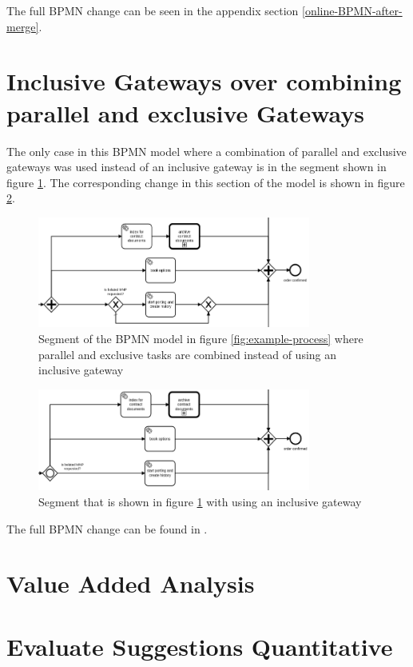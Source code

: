 The full BPMN change can be seen in the appendix section \ref{online-BPMN-after-merge}. 

\section{Inclusive Gateways over combining parallel and exclusive Gateways}
The only case in this BPMN model where a combination of parallel and exclusive gateways was used instead of an inclusive gateway is in the segment shown in figure \ref{fig:exclusive-org}. The corresponding change in this section of the model is shown in figure \ref{fig:exclusive-new}. 


\begin{figure}[H]
	\centering
	\includegraphics[width=0.8\textwidth]{graphics/case-study-exclusive-org}
	\caption{Segment of the BPMN model in figure \ref{fig:example-process} where parallel and exclusive tasks are combined instead of using an inclusive gateway}
	\label{fig:exclusive-org}
\end{figure}
\begin{figure}[H]
	\centering
	\includegraphics[width=0.8\textwidth]{graphics/case-study-exclusive-new}
	\caption{Segment that is shown in figure \ref{fig:exclusive-org} with using an inclusive gateway}
	\label{fig:exclusive-new}
\end{figure}

The full BPMN change can be found in \cite{online-BPMN-after-exclusive}.

\section{Value Added Analysis}

\section{Evaluate Suggestions Quantitative}

